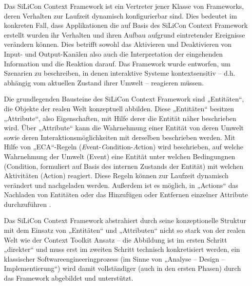 Das SiLiCon Context Framework \citep{Beer03} ist ein Vertreter jener Klasse von Frameworks, deren Verhalten zur Laufzeit dynamisch konfigurierbar sind. Dies bedeutet im konkreten Fall, dass Applikationen die auf Basis des SiLiCon Context Framework erstellt wurden ihr Verhalten und ihren Aufbau aufgrund eintretender Ereignisse verändern können. Dies betrifft sowohl das Aktivieren und Deaktivieren von Input- und Output-Kanälen also auch die Interpretation der eingehenden Information und die Reaktion darauf. Das Framework wurde entworfen, um Szenarien zu beschreiben, in denen interaktive Systeme kontextsensitiv -- d.h. abhängig vom aktuellen Zustand ihrer Umwelt -- reagieren müssen.

Die grundlegenden Bausteine des SiLiCon Context Framework sind „Entitäten“, die Objekte der realen Welt konzeptuell abbilden. Diese „Entitäten“ besitzen „Attribute“, also Eigenschaften, mit Hilfe derer die Entität näher beschrieben wird. Über „Attribute“ kann die Wahrnehmung einer Entität von deren Umwelt sowie deren Interaktionsmöglichkeiten mit derselben beschrieben werden. Mit Hilfe von „ECA“-Regeln (\emph{E}vent-\emph{C}ondition-\emph{A}ction) wird beschrieben, auf welche Wahrnehmung der Umwelt (Event) eine Entität unter welchen Bedingungnen (Condition, formuliert auf Basis des internen Zustands der Entität) mit welchen Aktivitäten (Action) reagiert. Diese Regeln können zur Laufzeit dynamisch verändert und nachgeladen werden. Außerdem ist es möglich, in „Actions“ das Nachladen von Entitäten oder das Hinzufügen oder Entfernen einzelner Attribute durchzuführen \citep[][S. 90]{Oppl04}.

Das SiLiCon Context Framework abstrahiert durch seine konzeptionelle Struktur mit dem Einsatz von „Entitäten“ und „Attributen“ nicht so stark von der realen Welt wie der Context Toolkit Ansatz -- die Abbildung ist im ersten Schritt „direkter“ und muss erst im zweiten Schritt technisch konkretisiert werden, ein klassischer Softwareengineeringprozess (im Sinne von „Analyse -- Design -- Implementierung“) wird damit vollständiger (auch in den ersten Phasen) durch das Framework abgebildet und unterstützt. 


